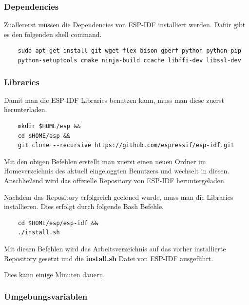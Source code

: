 \subsubsection{Dependencies}

Zuallererst müssen die Dependencies von ESP-IDF installiert werden. Dafür gibt es den folgenden shell command.

\vspace*{10px}
\begin{verbatim}
    sudo apt-get install git wget flex bison gperf python python-pip 
    python-setuptools cmake ninja-build ccache libffi-dev libssl-dev
\end{verbatim}
\vspace*{10px}

\subsubsection{Libraries}\label{sec:libraries}

Damit man die ESP-IDF Libraries benutzen kann, muss man diese zuerst herunterladen.

\vspace*{10px}
\begin{verbatim}
    mkdir $HOME/esp &&
    cd $HOME/esp &&
    git clone --recursive https://github.com/espressif/esp-idf.git
\end{verbatim}
\vspace*{10px}

Mit den obigen Befehlen erstellt man zuerst einen neuen Ordner im Homeverzeichnis des aktuell eingeloggten Benutzers und wechselt in diesen. 
Anschließend wird das offizielle Repository von ESP-IDF heruntergeladen.

Nachdem das Repository erfolgreich gecloned wurde, muss man die Libraries installieren. Dies erfolgt durch folgende Bash Befehle.

\vspace*{10px}
\begin{verbatim}
    cd $HOME/esp/esp-idf &&
    ./install.sh
\end{verbatim}
\vspace*{10px}

Mit diesen Befehlen wird das Arbeitsverzeichnis auf das vorher installierte Repository gesetzt und die \textbf{install.sh} Datei von ESP-IDF ausgeführt.

Dies kann einige Minuten dauern.

\subsubsection{Umgebungsvariablen}


